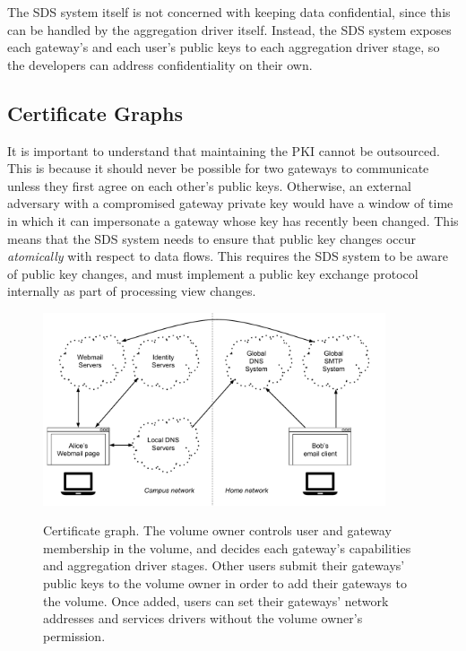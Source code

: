 The SDS system itself is not concerned with keeping data
confidential, since this can be handled by the aggregation driver itself.
Instead, the SDS system exposes each gateway's and each user's public keys to
each aggregation driver stage, so the developers can address confidentiality on their own.

\subsection{Certificate Graphs}

It is important to understand that maintaining the PKI cannot be outsourced.
This is because it should never be possible for two
gateways to communicate unless they first agree on each other's public keys.
Otherwise, an external adversary with a compromised gateway private key
would have a window of time in which it can
impersonate a gateway whose key has recently been changed.  This means that the
SDS system needs to ensure that public key changes occur \emph{atomically} with respect
to data flows.  This requires the SDS system to be aware of public key changes,
and must implement a public key exchange protocol internally as part of
processing view changes.

\begin{figure}[h!]
   \caption{Certificate graph.  The volume owner controls user and gateway
   membership in the volume, and decides each gateway's capabilities and
   aggregation driver stages.  Other users submit their gateways' public keys to the 
   volume owner in order to add their gateways to the volume.  Once added,
   users can set their gateways'
   network addresses and services drivers without the volume owner's permission.}
   \centering
   \includegraphics[width=0.9\textwidth,page=13]{figures/dissertation-figures}
   \label{fig:chap2-certificate-graph}
\end{figure}


